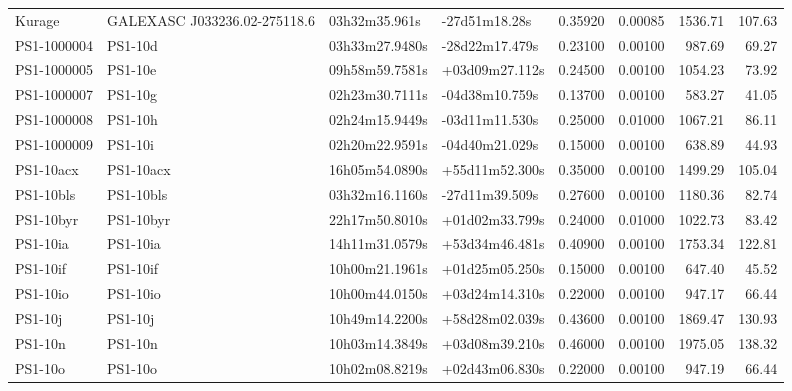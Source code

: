 \begin{longtable}{llllrrrr}
Kurage           &  GALEXASC J033236.02-275118.6   &   03h32m35.961s &   -27d51m18.28s &  0.35920 &  0.00085 &  1536.71 &      107.63 \\
PS1-1000004      &                         PS1-10d &  03h33m27.9480s &  -28d22m17.479s &  0.23100 &  0.00100 &   987.69 &       69.27 \\
PS1-1000005      &                         PS1-10e &  09h58m59.7581s &  +03d09m27.112s &  0.24500 &  0.00100 &  1054.23 &       73.92 \\
PS1-1000007      &                         PS1-10g &  02h23m30.7111s &  -04d38m10.759s &  0.13700 &  0.00100 &   583.27 &       41.05 \\
PS1-1000008      &                         PS1-10h &  02h24m15.9449s &  -03d11m11.530s &  0.25000 &  0.01000 &  1067.21 &       86.11 \\
PS1-1000009      &                         PS1-10i &  02h20m22.9591s &  -04d40m21.029s &  0.15000 &  0.00100 &   638.89 &       44.93 \\
PS1-10acx        &                       PS1-10acx &  16h05m54.0890s &  +55d11m52.300s &  0.35000 &  0.00100 &  1499.29 &      105.04 \\
PS1-10bls        &                       PS1-10bls &  03h32m16.1160s &  -27d11m39.509s &  0.27600 &  0.00100 &  1180.36 &       82.74 \\
PS1-10byr        &                       PS1-10byr &  22h17m50.8010s &  +01d02m33.799s &  0.24000 &  0.01000 &  1022.73 &       83.42 \\
PS1-10ia         &                        PS1-10ia &  14h11m31.0579s &  +53d34m46.481s &  0.40900 &  0.00100 &  1753.34 &      122.81 \\
PS1-10if         &                        PS1-10if &  10h00m21.1961s &  +01d25m05.250s &  0.15000 &  0.00100 &   647.40 &       45.52 \\
PS1-10io         &                        PS1-10io &  10h00m44.0150s &  +03d24m14.310s &  0.22000 &  0.00100 &   947.17 &       66.44 \\
PS1-10j          &                         PS1-10j &  10h49m14.2200s &  +58d28m02.039s &  0.43600 &  0.00100 &  1869.47 &      130.93 \\
PS1-10n          &                         PS1-10n &  10h03m14.3849s &  +03d08m39.210s &  0.46000 &  0.00100 &  1975.05 &      138.32 \\
PS1-10o          &                         PS1-10o &  10h02m08.8219s &  +02d43m06.830s &  0.22000 &  0.00100 &   947.19 &       66.44 \\

\end{longtable}
